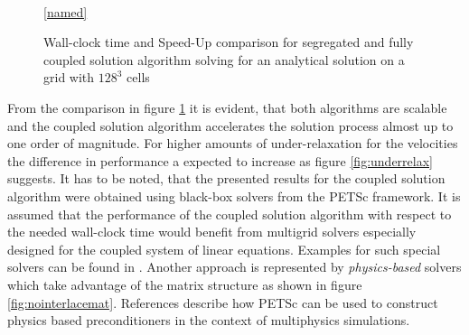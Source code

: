\begin{figure}[h!]
  \begin{center}
    \\
  \ref{named}
  \end{center}
  \caption{Wall-clock time and Speed-Up comparison for segregated and fully coupled solution algorithm solving for an analytical solution on a grid with $128^3$ cells}
   \label{fig:speedup}
\end{figure}

From the comparison in figure \ref{fig:speedup} it is evident, that both algorithms are scalable and the coupled solution algorithm accelerates the solution process almost up to one order of magnitude. For higher amounts of under-relaxation for the velocities the difference in performance a expected to increase as figure \ref{fig:underrelax} suggests. It has to be noted, that the presented results for the coupled solution algorithm were obtained using black-box solvers from the PETSc framework. It is assumed that the performance of the coupled solution algorithm with respect to the needed wall-clock time would benefit from multigrid solvers especially designed for the coupled system of linear equations. Examples for such special solvers can be found in \cite{darwish09,klaij13,mangani14}. Another approach is represented by \emph{physics-based} solvers which take advantage of the matrix structure as shown in figure \ref{fig:nointerlacemat}. References \cite{brown12,mcinnes14} describe how PETSc can be used to construct physics based preconditioners in the context of multiphysics simulations.

